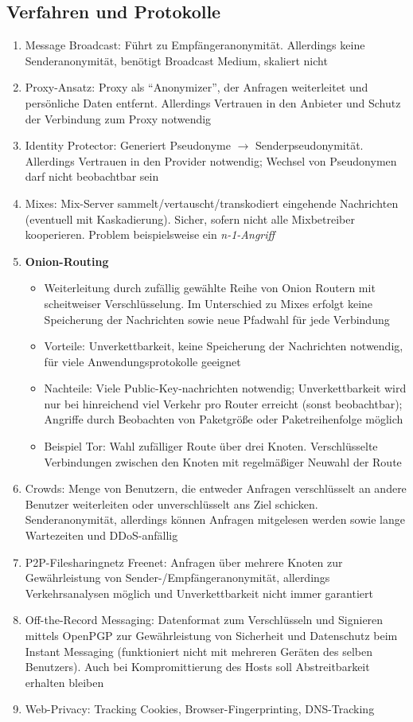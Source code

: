 \subsection{Verfahren und Protokolle}
\begin{enumerate}
	\item Message Broadcast: Führt zu Empfängeranonymität. Allerdings keine Senderanonymität, benötigt Broadcast Medium, skaliert nicht
	\item Proxy-Ansatz: Proxy als "`Anonymizer"', der Anfragen weiterleitet und persönliche Daten entfernt. Allerdings Vertrauen in den Anbieter und Schutz der Verbindung zum Proxy notwendig
	\item Identity Protector: Generiert Pseudonyme \(\rightarrow\) Senderpseudonymität. Allerdings Vertrauen in den Provider notwendig; Wechsel von Pseudonymen darf nicht beobachtbar sein
	\item Mixes: Mix-Server sammelt/vertauscht/transkodiert eingehende Nachrichten (eventuell mit Kaskadierung). Sicher, sofern nicht alle Mixbetreiber kooperieren. Problem beispielsweise ein \textit{n-1-Angriff}
	\item \textbf{Onion-Routing}
	\begin{itemize}
		\item Weiterleitung durch zufällig gewählte Reihe von Onion Routern mit scheitweiser Verschlüsselung. Im Unterschied zu Mixes erfolgt keine Speicherung der Nachrichten sowie neue Pfadwahl für jede Verbindung
		\item Vorteile: Unverkettbarkeit, keine Speicherung der Nachrichten notwendig, für viele Anwendungsprotokolle geeignet
		\item Nachteile: Viele Public-Key-nachrichten notwendig; Unverkettbarkeit wird nur bei hinreichend viel Verkehr pro Router erreicht (sonst beobachtbar); Angriffe durch Beobachten von Paketgröße oder Paketreihenfolge möglich
		\item Beispiel Tor: Wahl zufälliger Route über drei Knoten. Verschlüsselte Verbindungen zwischen den Knoten mit regelmäßiger Neuwahl der Route
	\end{itemize}
	\item Crowds: Menge von Benutzern, die entweder Anfragen verschlüsselt an andere Benutzer weiterleiten oder unverschlüsselt ans Ziel schicken. Senderanonymität, allerdings können Anfragen mitgelesen werden sowie lange Wartezeiten und DDoS-anfällig
	\item P2P-Filesharingnetz Freenet: Anfragen über mehrere Knoten zur Gewährleistung von Sender-/Empfängeranonymität, allerdings Verkehrsanalysen möglich und Unverkettbarkeit nicht immer garantiert
	\item Off-the-Record Messaging: Datenformat zum Verschlüsseln und Signieren mittels OpenPGP zur Gewährleistung von Sicherheit und Datenschutz beim Instant Messaging (funktioniert nicht mit mehreren Geräten des selben Benutzers). Auch bei Kompromittierung des Hosts soll Abstreitbarkeit erhalten bleiben
	\item Web-Privacy: Tracking Cookies, Browser-Fingerprinting, DNS-Tracking
\end{enumerate}


